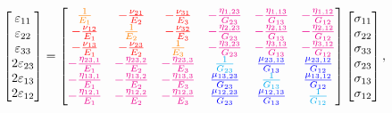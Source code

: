 \begin{equation}
    \begin{bmatrix}
        \varepsilon_{11}\\
        \varepsilon_{22}\\
        \varepsilon_{33}\\
        2\varepsilon_{23}\\
        2\varepsilon_{13}\\
        2\varepsilon_{12}\\
    \end{bmatrix}
    =
    \begin{bmatrix}
        \color{orange}\frac{1}{E_1}
        &\color{red}-\frac{\nu_{21}}{E_2}
        &\color{red}-\frac{\nu_{31}}{E_3}
        &\color{magenta}-\frac{\eta_{1,23}}{G_{23}}
        &\color{magenta}-\frac{\eta_{1,13}}{G_{13}}
        &\color{magenta}-\frac{\eta_{1,12}}{G_{12}}
        \\
        \color{red}-\frac{\nu_{12}}{E_1}
        &\color{orange}\frac{1}{E_2}
        &\color{red}-\frac{\nu_{32}}{E_3}
        &\color{magenta}-\frac{\eta_{2,23}}{G_{23}}
        &\color{magenta}-\frac{\eta_{2,13}}{G_{13}}
        &\color{magenta}-\frac{\eta_{2,12}}{G_{12}}
        \\
        \color{red}-\frac{\nu_{13}}{E_1}
        &\color{red}-\frac{\nu_{23}}{E_2}
        &\color{orange}\frac{1}{E_3}
        &\color{magenta}-\frac{\eta_{3,23}}{G_{23}}
        &\color{magenta}-\frac{\eta_{3,13}}{G_{13}}
        &\color{magenta}-\frac{\eta_{3,12}}{G_{12}}
        \\
        \color{magenta}-\frac{\eta_{23,1}}{E_1}
        &\color{magenta}-\frac{\eta_{23,2}}{E_2}
        &\color{magenta}-\frac{\eta_{23,3}}{E_3}
        &\color{cyan}\frac{1}{G_{23}}
        &\color{blue}\frac{\mu_{23,13}}{G_{13}}   
        &\color{blue}\frac{\mu_{23,12}}{G_{12}}
        \\
        \color{magenta}-\frac{\eta_{13,1}}{E_1}
        &\color{magenta}-\frac{\eta_{13,2}}{E_2}
        &\color{magenta}-\frac{\eta_{13,3}}{E_3}
        &\color{blue}\frac{\mu_{13,23}}{G_{23}} 
        &\color{cyan}\frac{1}{G_{13}}
        &\color{blue}\frac{\mu_{13,12}}{G_{12}}
        \\
        \color{magenta}-\frac{\eta_{12,1}}{E_1}
        &\color{magenta}-\frac{\eta_{12,2}}{E_2}
        &\color{magenta}-\frac{\eta_{12,3}}{E_3}
        &\color{blue}\frac{\mu_{12,23}}{G_{23}}
        &\color{blue}\frac{\mu_{12,13}}{G_{13}}
        &\color{cyan}\frac{1}{G_{12}}
        \\
    \end{bmatrix}
    \begin{bmatrix}
        \sigma_{11}\\
        \sigma_{22}\\
        \sigma_{33}\\
        \sigma_{23}\\
        \sigma_{13}\\
        \sigma_{12}\\
    \end{bmatrix},
\end{equation}
